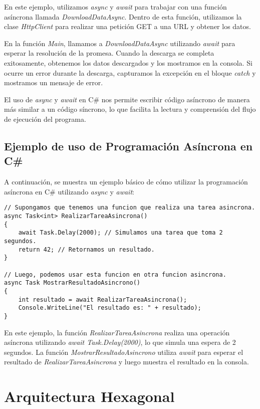 \documentclass[executivepaper]{article}
\begin{document}
En este ejemplo, utilizamos \emph{async} y \emph{await} para trabajar con una función asíncrona llamada \emph{DownloadDataAsync}. Dentro de esta función, utilizamos la clase \emph{HttpClient} para realizar una petición GET a una URL y obtener los datos.

En la función \emph{Main}, llamamos a \emph{DownloadDataAsync} utilizando \emph{await} para esperar la resolución de la promesa. Cuando la descarga se completa exitosamente, obtenemos los datos descargados y los mostramos en la consola. Si ocurre un error durante la descarga, capturamos la excepción en el bloque \emph{catch} y mostramos un mensaje de error.

El uso de \emph{async} y \emph{await} en C\# nos permite escribir código asíncrono de manera más similar a un código síncrono, lo que facilita la lectura y comprensión del flujo de ejecución del programa.

\subsection{Ejemplo de uso de Programación Asíncrona en C\#}

A continuación, se muestra un ejemplo básico de cómo utilizar la programación asíncrona en C\# utilizando \emph{async} y \emph{await}:

\begin{lstlisting}
// Supongamos que tenemos una funcion que realiza una tarea asincrona.
async Task<int> RealizarTareaAsincrona()
{
    await Task.Delay(2000); // Simulamos una tarea que toma 2 segundos.
    return 42; // Retornamos un resultado.
}

// Luego, podemos usar esta funcion en otra funcion asincrona.
async Task MostrarResultadoAsincrono()
{
    int resultado = await RealizarTareaAsincrona();
    Console.WriteLine("El resultado es: " + resultado);
}
\end{lstlisting}

En este ejemplo, la función \emph{RealizarTareaAsincrona} realiza una operación asíncrona utilizando \emph{await Task.Delay(2000)}, lo que simula una espera de 2 segundos. La función \emph{MostrarResultadoAsincrono} utiliza \emph{await} para esperar el resultado de \emph{RealizarTareaAsincrona} y luego muestra el resultado en la consola.

\section{Arquitectura Hexagonal}
\end{document}
